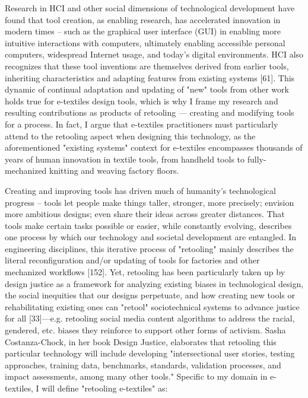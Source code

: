 Research in HCI and other social dimensions of technological development have found that tool creation, as enabling research, has accelerated innovation in modern times -- such as the graphical user interface (GUI) in enabling more intuitive interactions with computers, ultimately enabling accessible personal computers, widespread Internet usage, and today's digital environments. HCI also recognizes that these tool inventions are themselves derived from earlier tools, inheriting characteristics and adapting features from existing systems [61]. This dynamic of continual adaptation and updating of "new" tools from other work holds true for e-textiles design tools, which is why I frame my research and resulting contributions as products of retooling --- creating and modifying tools for a process. In fact, I argue that e-textiles practitioners must particularly attend to the retooling aspect when designing this technology, as the aforementioned "existing systems" context for e-textiles encompasses thousands of years of human innovation in textile tools, from handheld tools to fully-mechanized knitting and weaving factory floors.

Creating and improving tools has driven much of humanity's technological progress -- tools let people make things taller, stronger, more precisely; envision more ambitious designs; even share their ideas across greater distances. That tools make certain tasks possible or easier, while constantly evolving, describes one process by which our technology and societal development are entangled. In engineering disciplines, this iterative process of "retooling" mainly describes the literal reconfiguration and/or updating of tools for factories and other mechanized workflows [152]. Yet, retooling has been particularly taken up by design justice as a framework for analyzing existing biases in technological design, the social inequities that our designs perpetuate, and how creating new tools or rehabilitating existing ones can "retool" sociotechnical systems to advance justice for all [33]---e.g. retooling social media content algorithms to address the racial, gendered, etc. biases they reinforce to support other forms of activism. Sasha Costanza-Chock, in her book Design Justice, elaborates that retooling this particular technology will include developing "intersectional user stories, testing approaches, training data, benchmarks, standards, validation processes, and impact assessments, among many other tools." Specific to my domain in e-textiles, I will define "retooling e-textiles" as:

